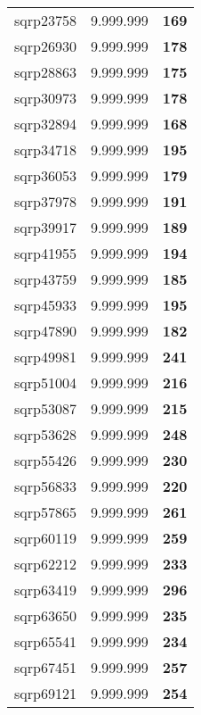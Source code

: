\begin{tabular}{cc||c}
sqrp23758        & 9.999.999        & {\bf 169}       \\ 
sqrp26930        & 9.999.999        & {\bf 178}       \\ 
sqrp28863        & 9.999.999        & {\bf 175}       \\ 
sqrp30973        & 9.999.999        & {\bf 178}       \\ 
sqrp32894        & 9.999.999        & {\bf 168}       \\ 
sqrp34718        & 9.999.999        & {\bf 195}       \\ 
sqrp36053        & 9.999.999        & {\bf 179}       \\ 
sqrp37978        & 9.999.999        & {\bf 191}       \\ 
sqrp39917        & 9.999.999        & {\bf 189}       \\ 
sqrp41955        & 9.999.999        & {\bf 194}       \\ 
sqrp43759        & 9.999.999        & {\bf 185}       \\ 
sqrp45933        & 9.999.999        & {\bf 195}       \\ 
sqrp47890        & 9.999.999        & {\bf 182}       \\ 
sqrp49981        & 9.999.999        & {\bf 241}       \\ 
sqrp51004        & 9.999.999        & {\bf 216}       \\ 
sqrp53087        & 9.999.999        & {\bf 215}       \\ 
sqrp53628        & 9.999.999        & {\bf 248}       \\ 
sqrp55426        & 9.999.999        & {\bf 230}       \\ 
sqrp56833        & 9.999.999        & {\bf 220}       \\ 
sqrp57865        & 9.999.999        & {\bf 261}       \\ 
sqrp60119        & 9.999.999        & {\bf 259}       \\ 
sqrp62212        & 9.999.999        & {\bf 233}       \\ 
sqrp63419        & 9.999.999        & {\bf 296}       \\ 
sqrp63650        & 9.999.999        & {\bf 235}       \\ 
sqrp65541        & 9.999.999        & {\bf 234}       \\ 
sqrp67451        & 9.999.999        & {\bf 257}       \\ 
sqrp69121        & 9.999.999        & {\bf 254}       \\ 

\end{tabular}
